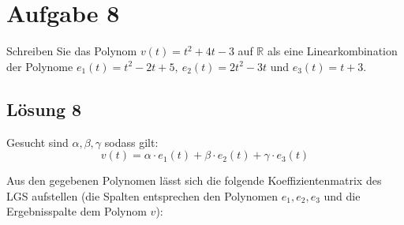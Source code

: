 \documentclass[main.tex]{subfiles}
\begin{document}
\arraycolsep=1.2pt %

\section{Aufgabe 8}

Schreiben Sie das Polynom $v( t) =t^{2} +4t-3$ auf $\mathbb{R}$ als eine Linearkombination der Polynome $e_{1}( t) =t^{2} -2t+5,\ e_{2}( t) =2t^{2} -3t$ und $e_{3}( t) =t+3$.

\subsection{Lösung 8}

Gesucht sind $\alpha ,\beta ,\gamma $ sodass gilt:
\begin{equation*}
    v( t) =\alpha \cdotp e_{1}( t) +\beta \cdotp e_{2}( t) +\gamma \cdotp e_{3}( t)
\end{equation*}

Aus den gegebenen Polynomen lässt sich die folgende Koeffizientenmatrix des LGS aufstellen (die Spalten entsprechen den Polynomen $e_1, e_2, e_3$ und die Ergebnisspalte dem Polynom $v$):
\end{document}
